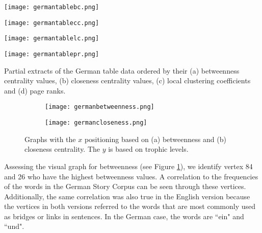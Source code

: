\begin{table}[!htb]
\centering
\begin{subtable}{.2\textwidth}
	\centering
	\texttt{[image: germantablebc.png]}
	\caption{}
	\label{table:germantablebc}
\end{subtable}
\hfill
\begin{subtable}{.2\textwidth}
	\centering
	\texttt{[image: germantablecc.png]}
	\caption{}
	\label{table:germantablecc}
\end{subtable}
\hfill
\begin{subtable}{.2\textwidth}
	\centering
	\texttt{[image: germantablelc.png]}
	\caption{}
	\label{table:germantablelc}
\end{subtable}
\hfill
\begin{subtable}{.2\textwidth}
	\centering
	\texttt{[image: germantablepr.png]}
	\caption{}
	\label{table:germantablepr}
\end{subtable}
\caption{Partial extracts of the German table data ordered by their (a) betweenness centrality values, (b) closeness centrality values, (c) local clustering coefficients and (d) page ranks.}
\label{table:germandata}
\end{table}

\begin{figure}[!htb]
\centering
\begin{subfigure}{.45\textwidth}
	\hspace{-1cm} 
	\texttt{[image: germanbetweenness.png]}
	\caption{}
	\label{fig:gerbc}
\end{subfigure}
\hfill
\begin{subfigure}{.45\textwidth}
	\hspace{-1cm} 
	\texttt{[image: germancloseness.png]}
	\caption{ }
	\label{fig:gercc}
\end{subfigure}
\caption{Graphs with the $x$ positioning based on (a) betweenness and (b) closeness centrality. The $y$ is based on trophic levels.}
\label{fig:gercentrality}
\end{figure}

Assessing the visual graph for betweenness (see Figure \ref{fig:gerbc}), we identify vertex 84 and 26 who have the highest betweenness  values. A correlation to the frequencies of the words in the German Story Corpus can be seen through these vertices. Additionally, the same correlation was also true in the English version because the vertices in both versions referred to the words that are most commonly used as bridges or links in sentences. In the German case, the words are ``ein" and ``und".

